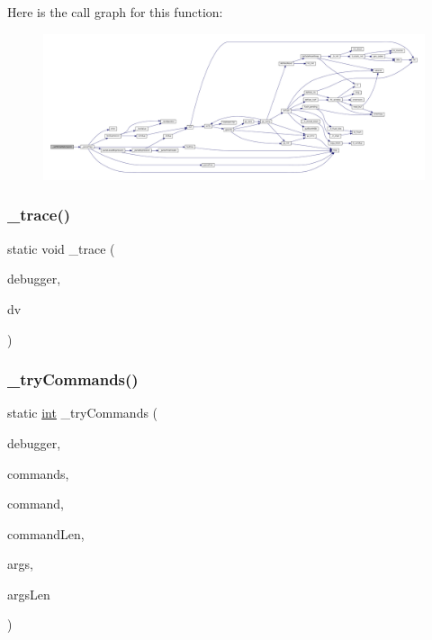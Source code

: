 Here is the call graph for this function\+:
\nopagebreak
\begin{figure}[H]
\begin{center}
\leavevmode
\includegraphics[width=350pt]{debugger_2cli-debugger_8c_af6aec1b47f652b1a4dd4f98d9e1dacc1_cgraph}
\end{center}
\end{figure}
\mbox{\label{debugger_2cli-debugger_8c_a80cf5fb5ee6e64803683a6b205b36d57}} 
\subsubsection{\texorpdfstring{\+\_\+trace()}{\_trace()}}
{\footnotesize\ttfamily static void \+\_\+trace (\begin{DoxyParamCaption}\item[{struct C\+L\+I\+Debugger $\ast$}]{debugger,  }\item[{struct C\+L\+I\+Debug\+Vector $\ast$}]{dv }\end{DoxyParamCaption})\hspace{0.3cm}{\ttfamily [static]}}

\mbox{\label{debugger_2cli-debugger_8c_afe13a4b051acdd4ffee4a8bdaf89651b}} 
\subsubsection{\texorpdfstring{\+\_\+try\+Commands()}{\_tryCommands()}}
{\footnotesize\ttfamily static \mbox{\hyperlink{ioapi_8h_a787fa3cf048117ba7123753c1e74fcd6}{int}} \+\_\+try\+Commands (\begin{DoxyParamCaption}\item[{struct C\+L\+I\+Debugger $\ast$}]{debugger,  }\item[{struct C\+L\+I\+Debugger\+Command\+Summary $\ast$}]{commands,  }\item[{const char $\ast$}]{command,  }\item[{size\+\_\+t}]{command\+Len,  }\item[{const char $\ast$}]{args,  }\item[{size\+\_\+t}]{args\+Len }\end{DoxyParamCaption})\hspace{0.3cm}{\ttfamily [static]}}

